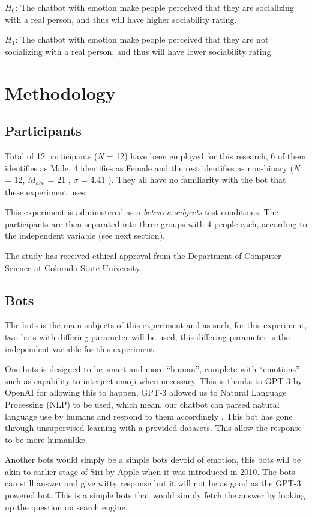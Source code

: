 \documentclass{vgtc}                          %
\begin{document}
$H_0$: The chatbot with emotion make people perceived that they are socializing with a real person, and thus will have higher sociability rating.

$H_1$: The chatbot with emotion make people perceived that they are not socializing with a real person, and thus will have lower sociability rating.

\section{Methodology}
\subsection{Participants}
Total of 12 participants (\textit{N} = 12) have been employed for this research, 6 of them identifies as Male, 4 identifies as Female and the rest identifies as non-binary (\textit{N} = 12, $M_{age}$ = 21 , $\sigma$ = 4.41 ). They all have no familiarity with the bot that these experiment uses.

This experiment is administered as a \emph{between-subjects} test conditions. The participants are then separated into three groups with 4 people each, according to the independent variable (see next section).

The study has received ethical approval from the Department of Computer Science at Colorado State University.

\subsection{Bots}
The bots is the main subjects of this experiment and as such, for this experiment, two bots with differing parameter will be used, this differing parameter is the independent variable for this experiment.

One bots is designed to be smart and more ``human'', complete with ``emotions'' such as capability to interject emoji when necessary. This is thanks to GPT-3 by OpenAI for allowing this to happen, GPT-3 allowed us to Natural Language Processing (NLP) to be used, which mean, our chatbot can parsed natural language use by humans and respond to them accordingly \cite{openai}. This bot has gone through unsupervised learning with a provided datasets. This allow the response to be more humanlike. 

Another bots would simply be a simple bots devoid of emotion, this bots will be akin to earlier stage of Siri by Apple when it was introduced in 2010. The bots can still answer and give witty response but it will not be as good as the GPT-3 powered bot. This is a simple bots that would simply fetch the answer by looking up the question on search engine.
\end{document}
